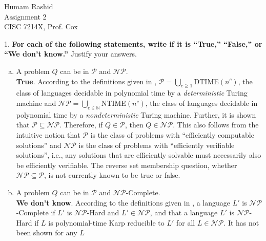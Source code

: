 \documentclass{scrartcl}
\begin{document}
\begin{flushleft}

    Humam Rashid\\
    Assignment 2\\
    CISC 7214X, Prof. Cox\\
    \bigskip

    1. \textbf{For each of the following statements, write if it is ``True,'' ``False,'' or ``We
    don't know.''} Justify your answers.\\
    \begin{enumerate}[(a)]
        \item A problem $Q$ can be in $\mathcal{P}$ and $\mathcal{NP}$.\\
            \bigskip
            \textbf{True}. According to the definitions given in \cite{modernapp}, $\mathcal{P} =
            \bigcup_{c \geq 1}$DTIME$(n^c)$, the class of languages decidable in polynomial time by
            a \emph{deterministic} Turing machine and $\mathcal{NP} = \bigcup_{c \in
            \mathbb{N}}$NTIME$(n^c)$, the class of languages decidable in polynomial time by a
            \emph{nondeterministic} Turing machine. Further, it is shown that $\mathcal{P} \subseteq
            \mathcal{NP}$. Therefore, if $Q \in \mathcal{P}$, then $Q \in \mathcal{NP}$. This also
            follows from the intuitive notion that $\mathcal{P}$ is the class of problems with
            ``efficiently computable solutions'' and $\mathcal{NP}$ is the class of problems with
            ``efficiently verifiable solutions'', i.e., any solutions that are efficiently solvable
            must necessarily also be efficiently verifiable. The reverse set membership question,
            whether $\mathcal{NP} \subseteq \mathcal{P}$, is not currently known to be true or
            false.
        \item A problem $Q$ can be in $\mathcal{P}$ and $\mathcal{NP}$-Complete.\\
            \bigskip
            \textbf{We don't know}. According to the definitions given in \cite{modernapp}, a
            language $L'$ is $\mathcal{NP}$-Complete if $L'$ is $\mathcal{NP}$-Hard and $L' \in
            \mathcal{NP}$, and that a language $L'$ is $\mathcal{NP}$-Hard if $L$ is polynomial-time
            Karp reducible to $L'$ for all $L \in \mathcal{NP}$. It has not been shown for any $L$

\end{enumerate}
\end{flushleft}
\end{document}
